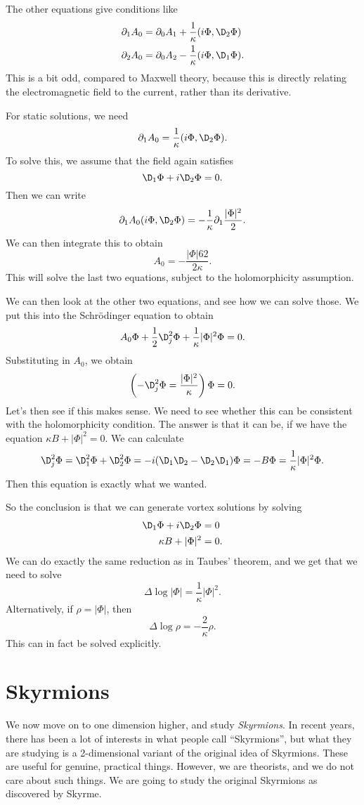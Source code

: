 \documentclass[a4paper]{article}
\begin{document}
The other equations give conditions like
\begin{align*}
  \partial_1 A_0 &= \partial_0 A_1 + \frac{1}{\kappa} (i \Phi, \D_2 \Phi)\\
  \partial_2 A_0 &= \partial_0 A_2 - \frac{1}{\kappa} (i \Phi, \D_1 \Phi).
\end{align*}
This is a bit odd, compared to Maxwell theory, because this is directly relating the electromagnetic field to the current, rather than its derivative.

For static solutions, we need
\[
  \partial_1 A_0 = \frac{1}{\kappa} (i \Phi, \D_2 \Phi).
\]
To solve this, we assume that the field again satisfies
\[
  \D_1 \Phi + i \D_2 \Phi = 0.
\]
Then we can write
\[
  \partial_1 A_0 (i \Phi, \D_2 \Phi) = - \frac{1}{\kappa} \partial_1 \frac{|\Phi|^2}{2}.
\]
We can then integrate this to obtain
\[
  A_0 = -\frac{|\Phi|62}{ 2 \kappa}.
\]
This will solve the last two equations, subject to the holomorphicity assumption.

We can then look at the other two equations, and see how we can solve those. We put this into the Schr\"odinger equation to obtain
\[
  A_0 \Phi + \frac{1}{2} \D_j^2 \Phi + \frac{1}{\kappa} |\Phi|^2 \Phi = 0.
\]
Substituting in $A_0$, we obtain
\[
  \left(- \D_j^2 \Phi = \frac{|\Phi|^2}{\kappa} \right)\Phi = 0.
\]
Let's then see if this makes sense. We need to see whether this can be consistent with the holomorphicity condition. The answer is that it can be, if we have the equation $\kappa B + |\Phi|^2 = 0$. We can calculate
\[
  \D_j^2 \Phi = \D_1^2 \Phi + \D_2^2 \Phi = -i (\D_1 \D_2 - \D_2 \D_1) \Phi = - B \Phi = \frac{1}{\kappa} |\Phi|^2 \Phi.
\]
Then this equation is exactly what we wanted.

So the conclusion is that we can generate vortex solutions by solving
\begin{align*}
  \D_1 \Phi + i \D_2 \Phi &= 0\\
  \kappa B + |\Phi|^2 &= 0.
\end{align*}
We can do exactly the same reduction as in Taubes' theorem, and we get that we need to solve
\[
  \Delta \log |\Phi| = \frac{1}{\kappa} |\Phi|^2.
\]
Alternatively, if $\rho = |\Phi|$, then
\[
  \Delta \log \rho = - \frac{2}{\kappa}\rho.
\]
This can in fact be solved explicitly.

\section{Skyrmions}
We now move on to one dimension higher, and study \emph{Skyrmions}. In recent years, there has been a lot of interests in what people call ``Skyrmions'', but what they are studying is a 2-dimensional variant of the original idea of Skyrmions. These are useful for genuine, practical things. However, we are theorists, and we do not care about such things. We are going to study the original Skyrmions as discovered by Skyrme. 
\end{document}
